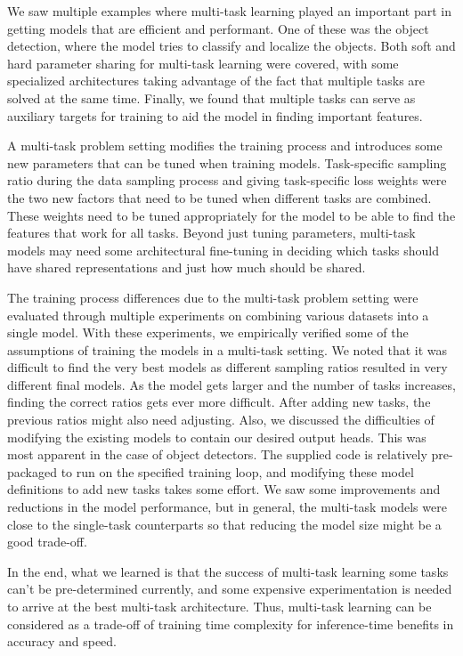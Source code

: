 We saw multiple examples where multi-task learning played an important part in getting models that are efficient and performant.
One of these was the object detection, where the model tries to classify and localize the objects.
Both soft and hard parameter sharing for multi-task learning were covered, with some specialized architectures taking advantage of the fact that multiple tasks are solved at the same time.
Finally, we found that multiple tasks can serve as auxiliary targets for training to aid the model in finding important features.

A multi-task problem setting modifies the training process and introduces some new parameters that can be tuned when training models.
Task-specific sampling ratio during the data sampling process and giving task-specific loss weights were the two new factors that need to be tuned when different tasks are combined.
These weights need to be tuned appropriately for the model to be able to find the features that work for all tasks.
Beyond just tuning parameters, multi-task models may need some architectural fine-tuning in deciding which tasks should have shared representations and just how much should be shared.

The training process differences due to the multi-task problem setting were evaluated through multiple experiments on combining various datasets into a single model.
With these experiments, we empirically verified some of the assumptions of training the models in a multi-task setting.
We noted that it was difficult to find the very best models as different sampling ratios resulted in very different final models.
As the model gets larger and the number of tasks increases, finding the correct ratios gets ever more difficult.
After adding new tasks, the previous ratios might also need adjusting.
Also, we discussed the difficulties of modifying the existing models to contain our desired output heads.
This was most apparent in the case of object detectors. 
The supplied code is relatively pre-packaged to run on the specified training loop, and modifying these model definitions to add new tasks takes some effort.
We saw some improvements and reductions in the model performance, but in general, the multi-task models were close to the single-task counterparts so that reducing the model size might be a good trade-off.

In the end, what we learned is that the success of multi-task learning some tasks can't be pre-determined currently, and some expensive experimentation is needed to arrive at the best multi-task architecture.  
Thus, multi-task learning can be considered as a trade-off of training time complexity for inference-time benefits in accuracy and speed.